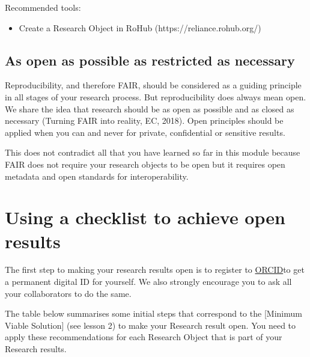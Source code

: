 \documentclass[
  letterpaper,
  DIV=11,
  numbers=noendperiod]{scrreport}
\providecommand{\tightlist}{%
  \setlength{\itemsep}{0pt}\setlength{\parskip}{0pt}}\usepackage{longtable,booktabs,array}
\begin{document}
Recommended tools:

\begin{itemize}
\tightlist
\item
  Create a Research Object in RoHub (https://reliance.rohub.org/)
\end{itemize}

\hypertarget{as-open-as-possible-as-restricted-as-necessary}{%
\subsection{As open as possible as restricted as
necessary}\label{as-open-as-possible-as-restricted-as-necessary}}

Reproducibility, and therefore FAIR, should be considered as a guiding
principle in all stages of your research process. But reproducibility
does always mean open. We share the idea that research should be as open
as possible and as closed as necessary (Turning FAIR into reality, EC,
2018). Open principles should be applied when you can and never for
private, confidential or sensitive results.

This does not contradict all that you have learned so far in this module
because FAIR does not require your research objects to be open but it
requires open metadata and open standards for interoperability.

\hypertarget{using-a-checklist-to-achieve-open-results}{%
\section{Using a checklist to achieve open
results}\label{using-a-checklist-to-achieve-open-results}}

The first step to making your research results open is to register to
\href{https://orcid.org/}{ORCID}to get a permanent digital ID for
yourself. We also strongly encourage you to ask all your collaborators
to do the same.

The table below summarises some initial steps that correspond to the
{[}Minimum Viable Solution{]} (see lesson 2) to make your Research
result open. You need to apply these recommendations for each Research
Object that is part of your Research results.
\end{document}
